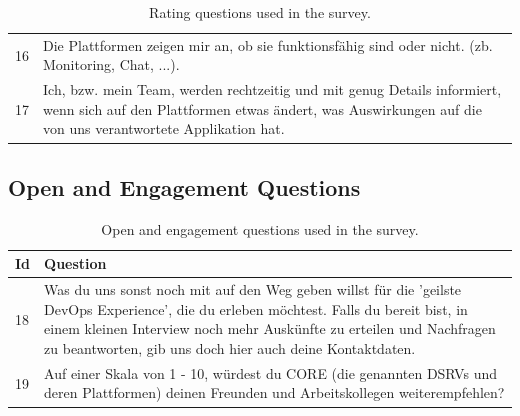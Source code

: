 \documentclass[a4paper,12pt]{article}
\begin{document}
\begin{table}[!htbp]
\begin{center}
\begin{tabularx}{\textwidth}{lX}
                16 & Die Plattformen zeigen mir an, ob sie funktionsfähig sind oder nicht. (zb. Monitoring, Chat, ...).                                                                                                                                                          \\
                17 & Ich, bzw. mein Team, werden rechtzeitig und mit genug Details informiert, wenn sich auf den Plattformen etwas ändert, was Auswirkungen auf die von uns verantwortete Applikation hat.                                                                       \\
                \bottomrule
            \end{tabularx}
        \end{center}
        \caption{\label{tab:ratingquestionstable} Rating questions used in the survey.}
    \end{table}

    \subsection{Open and Engagement Questions}
    \label{subsec:openandengagement}
    \begin{table}[!htbp]
        \begin{center}
            \begin{tabularx}{\textwidth}{lX}
                \toprule
                Id & Question                                                                                                                                                                                                                                                                    \\
                \midrule
                18 & Was du uns sonst noch mit auf den Weg geben willst für die 'geilste DevOps Experience', die du erleben möchtest. Falls du bereit bist, in einem kleinen Interview noch mehr Auskünfte zu erteilen und Nachfragen zu beantworten, gib uns doch hier auch deine Kontaktdaten. \\
                19 & Auf einer Skala von 1 - 10, würdest du CORE (die genannten DSRVs und deren Plattformen) deinen Freunden und Arbeitskollegen weiterempfehlen?                                                                                                                                \\
                \bottomrule
            \end{tabularx}
        \end{center}
        \caption{\label{tab:oetable} Open and engagement questions used in the survey.}
    \end{table}
\end{document}

